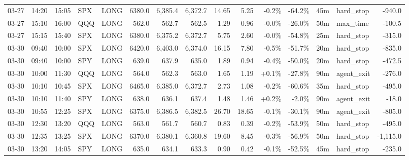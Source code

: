 \documentclass[11pt,a4paper,twoside]{article}
\begin{document}
\begin{landscape}
\begin{center}
\begin{longtable}{>{\color{txtmain}}l l l l l r r r r r r r r >{\color{txtmain}}l r}
03-27 & 14:20 & 15:05 & SPX & LONG & 6380.0 & 6,385.4 & 6,372.7 & 14.65 & 5.25 & \textcolor{lossred}{-0.2\%} & \textcolor{lossred}{-64.2\%} & 45m & hard\_stop & \textcolor{lossred}{-940.0} \\
03-27 & 15:10 & 16:00 & QQQ & LONG & 562.0 & 562.7 & 562.5 & 1.29 & 0.96 & \textcolor{lossred}{-0.0\%} & \textcolor{lossred}{-26.0\%} & 50m & max\_time & \textcolor{lossred}{-100.5} \\
03-27 & 15:15 & 15:40 & SPX & LONG & 6380.0 & 6,375.2 & 6,372.7 & 5.75 & 2.60 & \textcolor{lossred}{-0.0\%} & \textcolor{lossred}{-54.8\%} & 25m & hard\_stop & \textcolor{lossred}{-315.0} \\
03-30 & 09:40 & 10:00 & SPX & LONG & 6420.0 & 6,403.0 & 6,374.0 & 16.15 & 7.80 & \textcolor{lossred}{-0.5\%} & \textcolor{lossred}{-51.7\%} & 20m & hard\_stop & \textcolor{lossred}{-835.0} \\
03-30 & 09:40 & 10:00 & SPY & LONG & 639.0 & 637.9 & 635.0 & 1.89 & 0.94 & \textcolor{lossred}{-0.4\%} & \textcolor{lossred}{-50.0\%} & 20m & hard\_stop & \textcolor{lossred}{-472.5} \\
03-30 & 10:00 & 11:30 & QQQ & LONG & 564.0 & 562.3 & 563.0 & 1.65 & 1.19 & \textcolor{wingreen}{+0.1\%} & \textcolor{lossred}{-27.8\%} & 90m & agent\_exit & \textcolor{lossred}{-276.0} \\
03-30 & 10:10 & 10:45 & SPX & LONG & 6465.0 & 6,385.0 & 6,372.7 & 2.73 & 1.08 & \textcolor{lossred}{-0.2\%} & \textcolor{lossred}{-60.6\%} & 35m & hard\_stop & \textcolor{lossred}{-495.0} \\
03-30 & 10:10 & 11:40 & SPY & LONG & 638.0 & 636.1 & 637.4 & 1.48 & 1.46 & \textcolor{wingreen}{+0.2\%} & \textcolor{lossred}{-2.0\%} & 90m & agent\_exit & \textcolor{lossred}{-18.0} \\
03-30 & 10:55 & 12:25 & SPX & LONG & 6375.0 & 6,386.5 & 6,382.5 & 26.70 & 18.65 & \textcolor{lossred}{-0.1\%} & \textcolor{lossred}{-30.1\%} & 90m & agent\_exit & \textcolor{lossred}{-805.0} \\
03-30 & 12:30 & 13:20 & QQQ & LONG & 563.0 & 561.7 & 560.7 & 0.83 & 0.39 & \textcolor{lossred}{-0.2\%} & \textcolor{lossred}{-53.9\%} & 50m & hard\_stop & \textcolor{lossred}{-495.0} \\
03-30 & 12:35 & 13:25 & SPX & LONG & 6370.0 & 6,380.1 & 6,360.8 & 19.60 & 8.45 & \textcolor{lossred}{-0.3\%} & \textcolor{lossred}{-56.9\%} & 50m & hard\_stop & \textcolor{lossred}{-1,115.0} \\
03-30 & 13:20 & 14:05 & SPY & LONG & 635.0 & 634.1 & 633.3 & 0.90 & 0.42 & \textcolor{lossred}{-0.1\%} & \textcolor{lossred}{-52.5\%} & 45m & hard\_stop & \textcolor{lossred}{-235.0} \\

\end{longtable}
\end{center}
\end{landscape}
\end{document}
